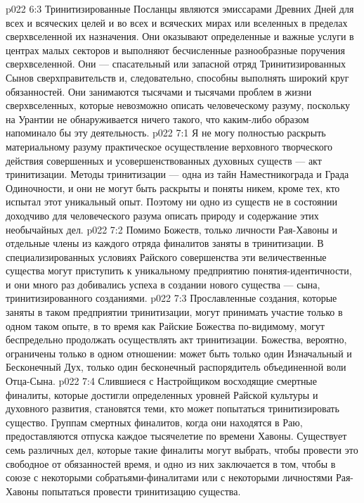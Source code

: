 \vs p022 6:3 Тринитизированные Посланцы являются эмиссарами Древних Дней для всех и всяческих целей и во всех и всяческих мирах или вселенных в пределах сверхвселенной их назначения. Они оказывают определенные и важные услуги в центрах малых секторов и выполняют бесчисленные разнообразные поручения сверхвселенной. Они --- спасательный или запасной отряд Тринитизированных Сынов сверхправительств и, следовательно, способны выполнять широкий круг обязанностей. Они занимаются тысячами и тысячами проблем в жизни сверхвселенных, которые невозможно описать человеческому разуму, поскольку на Урантии не обнаруживается ничего такого, что каким\hyp{}либо образом напоминало бы эту деятельность.
\vs p022 7:1 Я не могу полностью раскрыть материальному разуму практическое осуществление верховного творческого действия совершенных и усовершенствованных духовных существ --- акт тринитизации. Методы тринитизации --- одна из тайн Наместникограда и Града Одиночности, и они не могут быть раскрыты и поняты никем, кроме тех, кто испытал этот уникальный опыт. Поэтому ни одно из существ не в состоянии доходчиво для человеческого разума описать природу и содержание этих необычайных дел.
\vs p022 7:2 Помимо Божеств, только личности Рая\hyp{}Хавоны и отдельные члены из каждого отряда финалитов заняты в тринитизации. В специализированных условиях Райского совершенства эти величественные существа могут приступить к уникальному предприятию понятия\hyp{}идентичности, и они много раз добивались успеха в создании нового существа --- сына, тринитизированного созданиями.
\vs p022 7:3 Прославленные создания, которые заняты в таком предприятии тринитизации, могут принимать участие только в одном таком опыте, в то время как Райские Божества по\hyp{}видимому, могут беспредельно продолжать осуществлять акт тринитизации. Божества, вероятно, ограничены только в одном отношении: может быть только один Изначальный и Бесконечный Дух, только один бесконечный распорядитель объединенной воли Отца\hyp{}Сына.
\vs p022 7:4 Слившиеся с Настройщиком восходящие смертные финалиты, которые достигли определенных уровней Райской культуры и духовного развития, становятся теми, кто может попытаться тринитизировать существо. Группам смертных финалитов, когда они находятся в Раю, предоставляются отпуска каждое тысячелетие по времени Хавоны. Существует семь различных дел, которые такие финалиты могут выбрать, чтобы провести это свободное от обязанностей время, и одно из них заключается в том, чтобы в союзе с некоторыми собратьями\hyp{}финалитами или с некоторыми личностями Рая\hyp{}Хавоны попытаться провести тринитизацию существа.

